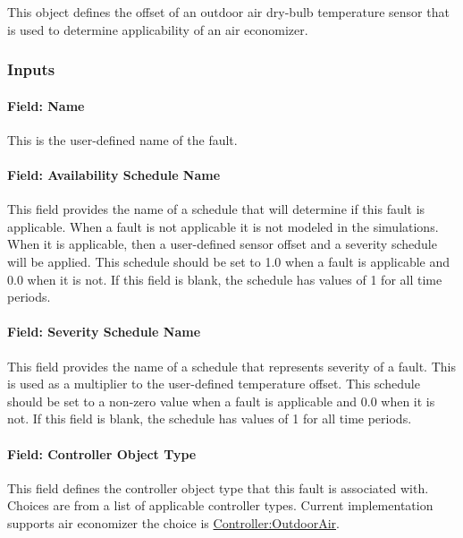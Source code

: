 This object defines the offset of an outdoor air dry-bulb temperature sensor that is used to determine applicability of an air economizer.

\subsubsection{Inputs}\label{inputs-029}

\paragraph{Field: Name}\label{field-name-028}

This is the user-defined name of the fault.

\paragraph{Field: Availability Schedule Name}\label{field-availability-schedule-name-011}

This field provides the name of a schedule that will determine if this fault is applicable. When a fault is not applicable it is not modeled in the simulations. When it is applicable, then a user-defined sensor offset and a severity schedule will be applied. This schedule should be set to 1.0 when a fault is applicable and 0.0 when it is not. If this field is blank, the schedule has values of 1 for all time periods.

\paragraph{Field: Severity Schedule Name}\label{field-severity-schedule-name}

This field provides the name of a schedule that represents severity of a fault. This is used as a multiplier to the user-defined temperature offset. This schedule should be set to a non-zero value when a fault is applicable and 0.0 when it is not. If this field is blank, the schedule has values of 1 for all time periods.

\paragraph{Field: Controller Object Type}\label{field-controller-object-type}

This field defines the controller object type that this fault is associated with. Choices are from a list of applicable controller types. Current implementation supports air economizer the choice is \hyperref[controlleroutdoorair]{Controller:OutdoorAir}.

